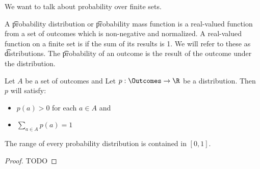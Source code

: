 

We want to talk about probability over finite sets.


A \t{probability distribution} or \t{probability mass function} is a real-valued function from a set of outcomes which is non-negative and normalized.
A real-valued function on a finite set is  if the sum of its results is 1.
We will refer to these as \t{distributions}.
The \t{probability of an outcome}{} is the result of the outcome under the distribution.


Let $A$ be a set of outcomes and
Let $p: \Outcomes \to \R$ be a distribution.
Then $p$ will satisfy:

\begin{itemize}

\item $p(a) > 0$ for each $a \in A$ and
\item $\sum_{a \in A} p(a) = 1$

\end{itemize}

\begin{prop}

The range of every probability distribution is contained in $[0, 1]$.

\begin{proof}

TODO

\end{proof}

\end{prop}

